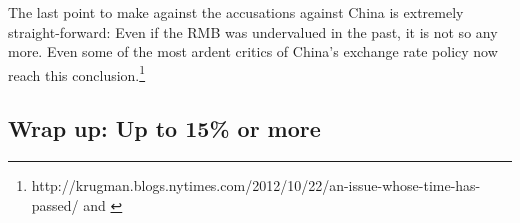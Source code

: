 The last point to make against the accusations against China is extremely straight-forward: Even if the RMB was undervalued in the past, it is not so any more. Even some of the most ardent critics of China's exchange rate policy now reach this conclusion.\footnote{\cite{Krugman2012}http://krugman.blogs.nytimes.com/2012/10/22/an-issue-whose-time-has-passed/ and \cite{ClineWilliamson2012}} %



\subsection{Wrap up: Up to 15\% or more}



%

